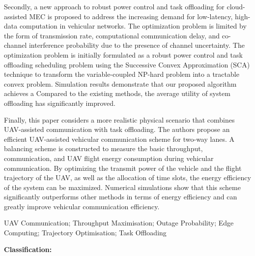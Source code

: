 Secondly, a new approach to robust power control and task offloading for cloud-assisted MEC is proposed to address the increasing demand for low-latency, high-data computation in vehicular networks. The optimization problem is limited by the form of transmission rate, computational communication delay, and co-channel interference probability due to the presence of channel uncertainty. The optimization problem is initially formulated as a robust power control and task offloading scheduling problem using the Successive Convex Approximation (SCA) technique to transform the variable-coupled NP-hard problem into a tractable convex problem.   Simulation results demonstrate that our proposed algorithm achieves a Compared to the existing methods, the average utility of system offloading has significantly improved.

Finally, this paper considers a more realistic physical scenario that combines UAV-assisted communication with task offloading. The authors propose an efficient UAV-assisted vehicular communication scheme for two-way lanes. A balancing scheme is constructed to measure the basic throughput, communication, and UAV flight energy consumption during vehicular communication. By optimizing the transmit power of the vehicle and the flight trajectory of the UAV, as well as the allocation of time slots, the energy efficiency of the system can be maximized. Numerical simulations show that this scheme significantly outperforms other methods in terms of energy efficiency and can greatly improve vehicular communication efficiency.

\begin{englishkeywords}
UAV Communication; Throughput Maximisation; Outage Probability; Edge Computing; Trajectory Optimisation; Task Offloading
\end{englishkeywords}

\makeatletter
\noindent\textbf{Classification:} \CAST@value@UDC
\makeatother
\cleardoublepage%
\makeatletter
{}
\pagestyle{fancy}
  \fancyhf{}
\makeatother
